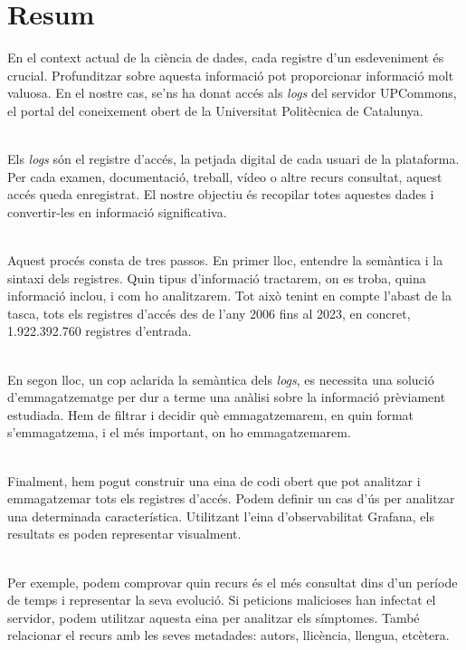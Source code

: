 \chapter*{Resum}\label{ch:abstract-ca}

En el context actual de la ciència de dades, cada registre d'un esdeveniment és crucial.
Profunditzar sobre aquesta informació pot proporcionar informació molt valuosa.
En el nostre cas, se'ns ha donat accés als \textit{logs} del servidor UPCommons, el portal del coneixement obert de la Universitat Politècnica de Catalunya.

\noindent \\
Els \textit{logs} són el registre d'accés, la petjada digital de cada usuari de la plataforma.
Per cada examen, documentació, treball, vídeo o altre recurs consultat, aquest accés queda enregistrat.
El nostre objectiu és recopilar totes aquestes dades i convertir-les en informació significativa.

\noindent \\
Aquest procés consta de tres passos.
En primer lloc, entendre la semàntica i la sintaxi dels registres.
Quin tipus d'informació tractarem, on es troba, quina informació inclou, i com ho analitzarem.
Tot això tenint en compte l'abast de la tasca, tots els registres d'accés des de l'any 2006 fins al 2023, en concret, 1.922.392.760 registres d'entrada.

\noindent \\
En segon lloc, un cop aclarida la semàntica dels \textit{logs}, es necessita una solució d'emmagatzematge per dur a terme una anàlisi sobre la informació prèviament estudiada.
Hem de filtrar i decidir què emmagatzemarem, en quin format s'emmagatzema, i el més important, on ho emmagatzemarem.

\noindent \\
Finalment, hem pogut construir una eina de codi obert que pot analitzar i emmagatzemar tots els registres d'accés.
Podem definir un cas d'ús per analitzar una determinada característica.
Utilitzant l'eina d'observabilitat Grafana, els resultats es poden representar visualment.

\noindent \\
Per exemple, podem comprovar quin recurs és el més consultat dins d'un període de temps i representar la seva evolució.
Si peticions malicioses han infectat el servidor, podem utilitzar aquesta eina per analitzar els símptomes.
També relacionar el recurs amb les seves metadades: autors, llicència, llengua, etcètera.

